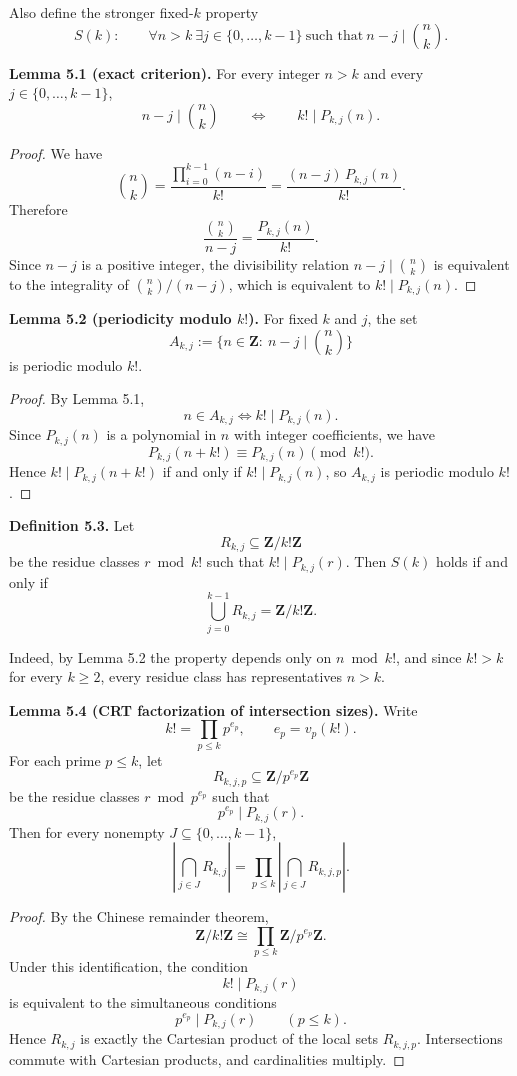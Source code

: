 Also define the stronger fixed-\(k\) property
\[
S(k):\qquad \forall n>k\ \exists j\in\{0,\dots,k-1\}\ \mbox{such that}\ n-j\mid \binom{n}{k}.
\]

\medskip
\noindent
\textbf{Lemma 5.1 (exact criterion).}
For every integer \(n>k\) and every \(j\in\{0,\dots,k-1\}\),
\[
n-j\mid \binom{n}{k}
\qquad\Longleftrightarrow\qquad
k!\mid P_{k,j}(n).
\]

\begin{proof}
We have
\[
\binom{n}{k}=\frac{\prod_{i=0}^{k-1}(n-i)}{k!}
=\frac{(n-j)\,P_{k,j}(n)}{k!}.
\]
Therefore
\[
\frac{\binom{n}{k}}{n-j}=\frac{P_{k,j}(n)}{k!}.
\]
Since \(n-j\) is a positive integer, the divisibility relation \(n-j\mid \binom{n}{k}\) is equivalent to the integrality of \(\binom{n}{k}/(n-j)\), which is equivalent to \(k!\mid P_{k,j}(n)\).
\end{proof}

\medskip
\noindent
\textbf{Lemma 5.2 (periodicity modulo \(k!\)).}
For fixed \(k\) and \(j\), the set
\[
A_{k,j}:=\{n\in\mathbf{Z}:\ n-j\mid \binom{n}{k}\}
\]
is periodic modulo \(k!\).

\begin{proof}
By Lemma 5.1,
\[
n\in A_{k,j}\iff k!\mid P_{k,j}(n).
\]
Since \(P_{k,j}(n)\) is a polynomial in \(n\) with integer coefficients, we have
\[
P_{k,j}(n+k!)\equiv P_{k,j}(n)\pmod{k!}.
\]
Hence \(k!\mid P_{k,j}(n+k!)\) if and only if \(k!\mid P_{k,j}(n)\), so \(A_{k,j}\) is periodic modulo \(k!\).
\end{proof}

\medskip
\noindent
\textbf{Definition 5.3.}
Let
\[
R_{k,j}\subseteq \mathbf{Z}/k!\mathbf{Z}
\]
be the residue classes \(r\bmod k!\) such that \(k!\mid P_{k,j}(r)\).  Then \(S(k)\) holds if and only if
\[
\bigcup_{j=0}^{k-1} R_{k,j}=\mathbf{Z}/k!\mathbf{Z}.
\]

Indeed, by Lemma 5.2 the property depends only on \(n\bmod k!\), and since \(k!>k\) for every \(k\ge 2\), every residue class has representatives \(n>k\).

\medskip
\noindent
\textbf{Lemma 5.4 (CRT factorization of intersection sizes).}
Write
\[
k! = \prod_{p\le k} p^{e_p},
\qquad e_p=v_p(k!).
\]
For each prime \(p\le k\), let
\[
R_{k,j,p}\subseteq \mathbf{Z}/p^{e_p}\mathbf{Z}
\]
be the residue classes \(r\bmod p^{e_p}\) such that
\[
p^{e_p}\mid P_{k,j}(r).
\]
Then for every nonempty \(J\subseteq \{0,\dots,k-1\}\),
\[
\left|\bigcap_{j\in J} R_{k,j}\right|
=
\prod_{p\le k}
\left|
\bigcap_{j\in J} R_{k,j,p}
\right|.
\]

\begin{proof}
By the Chinese remainder theorem,
\[
\mathbf{Z}/k!\mathbf{Z} \cong \prod_{p\le k} \mathbf{Z}/p^{e_p}\mathbf{Z}.
\]
Under this identification, the condition
\[
k!\mid P_{k,j}(r)
\]
is equivalent to the simultaneous conditions
\[
p^{e_p}\mid P_{k,j}(r)\qquad (p\le k).
\]
Hence \(R_{k,j}\) is exactly the Cartesian product of the local sets \(R_{k,j,p}\).  Intersections commute with Cartesian products, and cardinalities multiply.
\end{proof}

